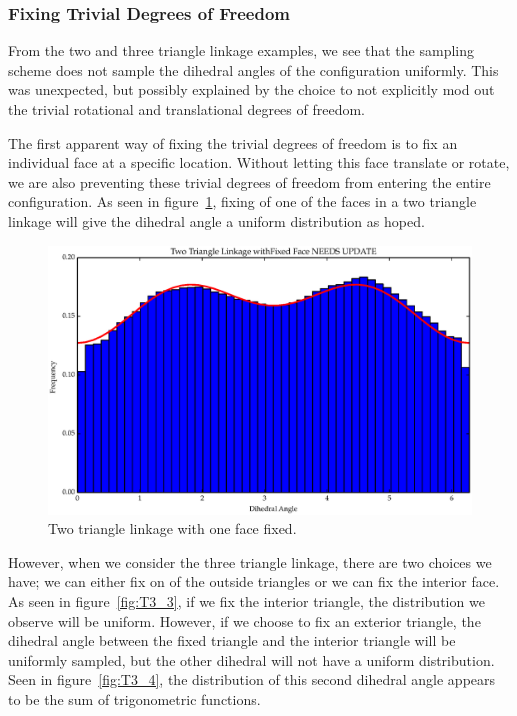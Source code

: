 \subsubsection{Fixing Trivial Degrees of Freedom}
From the two and three triangle linkage examples, we see that the sampling scheme does not sample the dihedral angles of the configuration uniformly. This was unexpected, but possibly explained by the choice to not explicitly mod out the trivial rotational and translational degrees of freedom. 

The first apparent way of fixing the trivial degrees of freedom is to fix an individual face at a specific location. Without letting this face translate or rotate, we are also preventing these trivial degrees of freedom from entering the entire configuration. As seen in figure~\ref{fig:T2_3}, fixing of one of the faces in a two triangle linkage will give the dihedral angle a uniform distribution as hoped. 
\begin{figure}[ht]
\centering
  \includegraphics[scale=0.6]{images/T2_3.eps}
\caption{Two triangle linkage with one face fixed.}
\label{fig:T2_3}
\end{figure}
However, when we consider the three triangle linkage, there are two choices we have; we can either fix on of the outside triangles or we can fix the interior face. As seen in figure~\ref{fig:T3_3}, if we fix the interior triangle, the distribution we observe will be uniform. However, if we choose to fix an exterior triangle, the dihedral angle between the fixed triangle and the interior triangle  will be uniformly sampled, but the other dihedral will not have a uniform distribution. Seen in figure~\ref{fig:T3_4}, the distribution of this second dihedral angle appears to be the sum of trigonometric functions.
